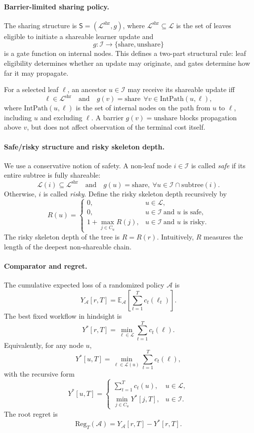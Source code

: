 \documentclass{article}
\begin{document}
\paragraph{Barrier-limited sharing policy.}
The sharing structure is \(\mathsf{S}=(\mathcal{L}^{\mathrm{shr}}, g)\), where \(\mathcal{L}^{\mathrm{shr}}\subseteq\mathcal{L}\) is the set of leaves eligible to initiate a shareable learner update and
\[
g:\mathcal{I}\rightarrow\{\mathrm{share},\mathrm{unshare}\}
\]
is a gate function on internal nodes. This defines a two-part structural rule: leaf eligibility determines whether an update may originate, and gates determine how far it may propagate.

For a selected leaf \(\ell\), an ancestor \(u\in\mathcal{I}\) may receive its shareable update iff
\[
\ell\in\mathcal{L}^{\mathrm{shr}}
\quad\text{and}\quad
g(v)=\mathrm{share}\ \ \forall v\in \mathrm{IntPath}(u,\ell),
\]
where \(\mathrm{IntPath}(u,\ell)\) is the set of internal nodes on the path from \(u\) to \(\ell\), including \(u\) and excluding \(\ell\). A barrier \(g(v)=\mathrm{unshare}\) blocks propagation above \(v\), but does not affect observation of the terminal cost itself.

\paragraph{Safe/risky structure and risky skeleton depth.}
We use a conservative notion of safety. A non-leaf node \(i\in\mathcal{I}\) is called \emph{safe} if its entire subtree is fully shareable:
\[
\mathcal{L}(i)\subseteq\mathcal{L}^{\mathrm{shr}}
\quad\text{and}\quad
g(u)=\mathrm{share},\ \forall u\in\mathcal{I}\cap\mathrm{subtree}(i).
\]
Otherwise, \(i\) is called \emph{risky}. Define the risky skeleton depth recursively by
\[
R(u)=
\begin{cases}
0, & u\in\mathcal{L},\\
0, & u\in\mathcal{I}\ \text{and }u\text{ is safe},\\
1+\max_{j\in C_u}R(j), & u\in\mathcal{I}\ \text{and }u\text{ is risky}.
\end{cases}
\]
The risky skeleton depth of the tree is \(R=R(r)\). Intuitively, \(R\) measures the length of the deepest non-shareable chain.

\paragraph{Comparator and regret.}
The cumulative expected loss of a randomized policy \(\mathcal{A}\) is
\[
Y_{\mathcal{A}}[r,T]
=
\mathbb{E}_{\mathcal{A}}
\left[
\sum_{t=1}^{T} c_t(\ell_t)
\right].
\]
The best fixed workflow in hindsight is
\[
Y^*[r,T] = \min_{\ell\in\mathcal{L}} \sum_{t=1}^{T} c_t(\ell).
\]
Equivalently, for any node \(u\),
\[
Y^*[u,T] = \min_{\ell\in\mathcal{L}(u)} \sum_{t=1}^{T} c_t(\ell),
\]
with the recursive form
\[
Y^*[u,T]
=
\begin{cases}
\sum_{t=1}^{T} c_t(u), & u\in\mathcal{L},\\[4pt]
\min_{j\in C_u} Y^*[j,T], & u\in\mathcal{I}.
\end{cases}
\]
The root regret is
\[
\mathrm{Reg}_T(\mathcal{A})
=
Y_{\mathcal{A}}[r,T]-Y^*[r,T].
\]
\end{document}
